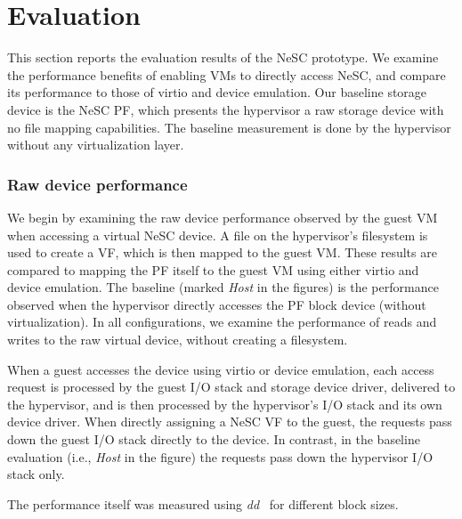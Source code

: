 \chapter{Evaluation}
\label{chap:eval}



This section reports the evaluation results of the NeSC prototype.
We examine the performance benefits of enabling VMs to directly access NeSC, and compare its performance to those of virtio and device emulation.
Our baseline storage device is the NeSC PF, which presents the hypervisor a raw storage device with no file mapping capabilities. The baseline measurement is done by the hypervisor without any virtualization layer.

\subsection{Raw device performance}

We begin by examining the raw device performance observed by the guest VM when accessing a virtual NeSC device. A file on the hypervisor's filesystem is used to create a VF, which is then mapped to the guest VM. These results are compared to mapping the PF itself to the guest VM using either virtio and device emulation. The baseline (marked \emph{Host} in the figures) is the performance observed when the hypervisor directly accesses the PF block device (without virtualization).
In all configurations, we examine the performance of reads and writes to the raw virtual device, without creating a filesystem. 

When a guest accesses the device using virtio or device emulation, each access  request is processed by the guest I/O stack and storage device driver, delivered to the hypervisor, and is then processed by the hypervisor's I/O stack and its own device driver.
When directly assigning a NeSC VF to the guest, the requests pass down the guest I/O stack directly to the device. In contrast, in the baseline evaluation (i.e., \emph{Host} in the figure) the requests pass down the hypervisor I/O stack only.

The performance itself was measured using \emph{dd}~\cite{coreutils} for different block sizes.

